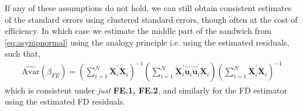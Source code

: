 If any of these assumptions do not hold, we can still obtain consistent estimates of the standard errors using clustered standard errors, though often at the cost of efficiency. In which case we estimate the middle part of the sandwich from \eqref{eq:asympnormal} using the analogy principle i.e. using the estimated residuals, such that, 
\begin{align*}
    \hat{\text{Avar}}(\hat{\beta}_{FE}) = \left( \sum_{i=1}^N \bm{\ddot{X}}_i^\prime \bm{\ddot{X}}_i \right)^{-1} \left( \sum_{i=1}^N \bm{\ddot{X}}_i^\prime \hat{\ddot{\bm{u}}}_i \hat{\ddot{\bm{u}}}_i^\prime \bm{\ddot{X}}_i \right) \left( \sum_{i=1}^N \bm{\ddot{X}}_i^\prime \bm{\ddot{X}}_i \right)^{-1}
\end{align*} 
which is consistent under \textit{just} \textbf{FE.1, FE.2}, and similarly for the FD estimator using the estimated FD residuals.
